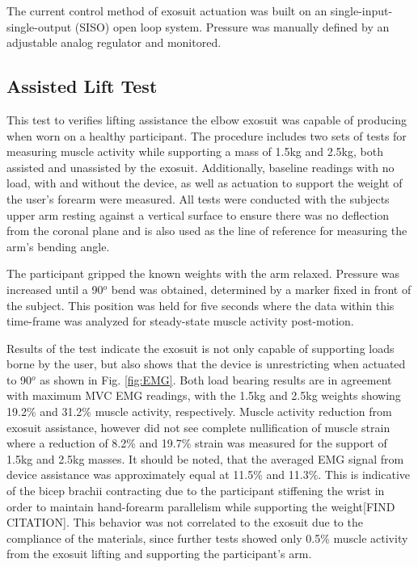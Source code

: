 \documentclass[letterpaper, 10 pt, conference]{ieeeconf}  %
\begin{document}
The current control method of exosuit actuation was built on an single-input-single-output (SISO) open loop system. Pressure was manually defined by an adjustable analog regulator and monitored.


\subsection{Assisted Lift Test}

This test to verifies lifting assistance the elbow exosuit was capable of producing when worn on a healthy participant. The procedure includes two sets of tests for measuring muscle activity while supporting a mass of 1.5kg and 2.5kg, both assisted and unassisted by the exosuit. Additionally, baseline readings with no load, with and without the device, as well as actuation to support the weight of the user’s forearm were measured. All tests were conducted with the subjects upper arm resting against a vertical surface to ensure there was no deflection from the coronal plane and is also used as the line of reference for measuring the arm’s bending angle. 

The participant gripped the known weights with the arm relaxed. Pressure was increased until a 90$^o$ bend was obtained, determined by a marker fixed in front of the subject. This position was held for five seconds where the data within this time-frame was analyzed for steady-state muscle activity post-motion.  

Results of the test indicate the exosuit is not only capable of supporting loads borne by the user, but also shows that the device is unrestricting when actuated to 90$^o$ as shown in Fig. \ref{fig:EMG}. Both load bearing results are in agreement with maximum MVC EMG readings, with the 1.5kg and 2.5kg weights showing 19.2\% and 31.2\% muscle activity, respectively. Muscle activity reduction from exosuit assistance, however did not see complete nullification of muscle strain where a reduction of 8.2\% and 19.7\% strain was measured for the support of 1.5kg and 2.5kg masses. It should be noted, that the averaged EMG signal from device assistance was approximately equal at 11.5\% and 11.3\%. This is indicative of the bicep brachii contracting due to the participant stiffening the wrist in order to maintain hand-forearm parallelism while supporting the weight[FIND CITATION]. This behavior was not correlated to the exosuit due to the compliance of the materials, since further tests showed only 0.5\% muscle activity from the exosuit lifting and supporting the participant’s arm. 
\end{document}
